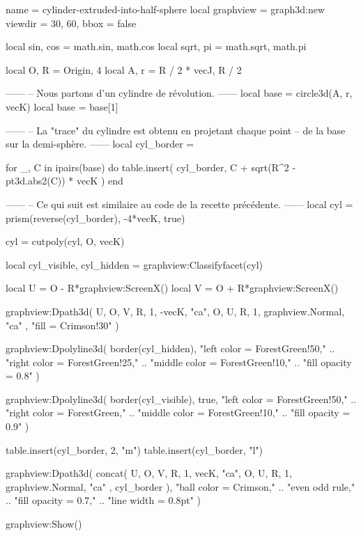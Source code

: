 \documentclass{standalone}
\begin{document}
\begin{luadraw*}{name = cylinder-extruded-into-half-sphere}
local graphview = graph3d:new{
  viewdir = {30, 60},
  bbox    = false
}

local sin, cos = math.sin, math.cos
local sqrt, pi = math.sqrt, math.pi

local O, R = Origin, 4
local A, r = R / 2 * vecJ, R / 2

------
-- Nous partons d'un cylindre de révolution.
------
local base = circle3d(A, r, vecK)
local base = base[1]

------
-- La "trace" du cylindre est obtenu en projetant chaque point
-- de la base sur la demi-sphère.
------
local cyl_border = {}

for _, C in ipairs(base) do
  table.insert(
    cyl_border,
    C + sqrt(R^2 - pt3d.abs2(C)) * vecK
  )
end

------
-- Ce qui suit est similaire au code de la recette précédente.
------
local cyl = prism(reverse(cyl_border), -4*vecK, true)

cyl = cutpoly(cyl, {O, vecK})

local cyl_visible, cyl_hidden = graphview:Classifyfacet(cyl)

local U = O - R*graphview:ScreenX()
local V = O + R*graphview:ScreenX()

graphview:Dpath3d(
  {
    U, O, V, R, 1, -vecK, "ca",
    O, U, R, 1, graphview.Normal, "ca"
  },
  "fill = Crimson!30"
)

graphview:Dpolyline3d(
  border(cyl_hidden),
     "left color = ForestGreen!50,"
  .. "right color = ForestGreen!25,"
  .. "middle color = ForestGreen!10,"
  .. "fill opacity = 0.8"
)

graphview:Dpolyline3d(
  border(cyl_visible),
  true,
     "left color = ForestGreen!50,"
  .. "right color = ForestGreen,"
  .. "middle color = ForestGreen!10,"
  .. "fill opacity = 0.9"
)

table.insert(cyl_border, 2, "m")
table.insert(cyl_border, "l")

graphview:Dpath3d(
  concat(
    {
      U, O, V, R, 1, vecK, "ca",
      O, U, R, 1, graphview.Normal, "ca"
    },
    cyl_border
  ),
     "ball color = Crimson,"
  .. "even odd rule,"
  .. "fill opacity = 0.7,"
  .. "line width = 0.8pt"
)

graphview:Show()
\end{luadraw*}
\end{document}

